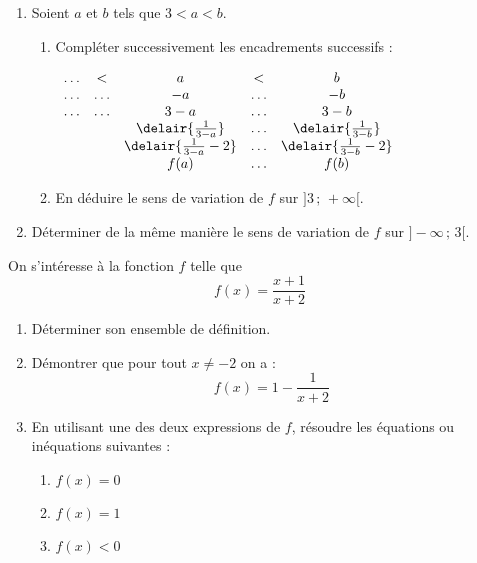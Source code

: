 \begin{multicols}{2}
\begin{exo}
\begin{enumerate}
 \item Soient $a$ et $b$ tels que $3<a<b$.
	\begin{enumerate}
	 \item Compl\'eter successivement les encadrements successifs :
	\begin{center}
	  $\begin{array}{ccccc}
	  \ldots & < & a & <  & b \\
	  \ldots & \ldots & -a & \ldots  & -b \\
	  \ldots & \ldots & 3-a & \ldots  & 3-b \\
	   &  & \delair{\frac{1}{3-a}} & \ldots  & \delair{\frac{1}{3-b}} \\
	   &  & \delair{\frac{1}{3-a}-2} & \ldots  & \delair{\frac{1}{3-b}-2} \\
	   &  & f(a) & \ldots  & f(b) \\
	  \end{array}$	             \end{center}
	 \item En d\'eduire le sens de variation de $f$ sur $]3\,;\,+\infty[$.
	\end{enumerate}
 \item D\'eterminer de la m\^eme mani\`ere le sens de variation de $f$ sur $]-\infty\,;\,3[$.
\end{enumerate}
\end{exo}


\begin{exo}
On s'int\'eresse \`a la fonction $f$ telle que \[f(x)=\frac{x+1}{x+2}\]
\begin{enumerate}
 \item D\'eterminer son ensemble de d\'efinition.
 \item D\'emontrer que pour tout $x\neq-2$ on a : \[f(x)=1-\frac{1}{x+2}\]
 \item En utilisant une des deux expressions de $f$, r\'esoudre les \'equations ou in\'equations suivantes :
	\vspace{-1em}\begin{multicols}{2}
	\begin{enumerate}
	 \item $f(x)=0$
	 \item $f(x)=1$
	 \item $f(x)<0$
	\end{enumerate}\end{multicols}\vspace{-1em}


\end{enumerate}
\end{exo}
\end{multicols}
